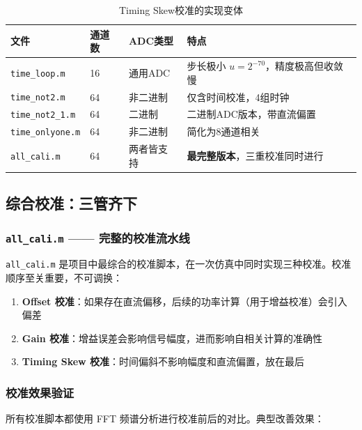 \documentclass[UTF8,a4paper,11pt]{ctexart}
\begin{document}
\begin{table}[ht]
\centering
\caption{Timing Skew校准的实现变体}
\begin{tabular}{p{2.5cm}p{1.5cm}p{3cm}p{5cm}}
\toprule
\textbf{文件} & \textbf{通道数} & \textbf{ADC类型} & \textbf{特点} \\
\midrule
\texttt{time\_loop.m} & 16 & 通用ADC & 步长极小 $u=2^{-70}$，精度极高但收敛慢 \\
\texttt{time\_not2.m} & 64 & 非二进制 & 仅含时间校准，4组时钟 \\
\texttt{time\_not2\_1.m} & 64 & 二进制 & 二进制ADC版本，带直流偏置 \\
\texttt{time\_onlyone.m} & 64 & 非二进制 & 简化为8通道相关 \\
\texttt{all\_cali.m} & 64 & 两者皆支持 & \textbf{最完整版本}，三重校准同时进行 \\
\bottomrule
\end{tabular}
\end{table}

\subsection{综合校准：三管齐下}
\label{sec:combined}

\subsubsection{\texttt{all\_cali.m} —— 完整的校准流水线}

\texttt{all\_cali.m} 是项目中最综合的校准脚本，在一次仿真中同时实现三种校准。校准顺序至关重要，不可调换：

\begin{enumerate}
    \item \textbf{Offset 校准}：如果存在直流偏移，后续的功率计算（用于增益校准）会引入偏差
    \item \textbf{Gain 校准}：增益误差会影响信号幅度，进而影响自相关计算的准确性
    \item \textbf{Timing Skew 校准}：时间偏斜不影响幅度和直流偏置，放在最后
\end{enumerate}

\subsubsection{校准效果验证}

所有校准脚本都使用 FFT 频谱分析进行校准前后的对比。典型改善效果：
\end{document}
